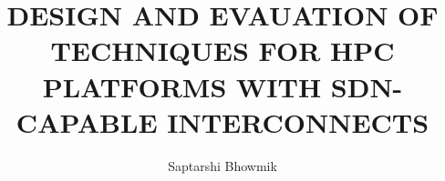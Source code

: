 \documentclass[11pt,expanded,copyright]{fsuthesis}
\title{DESIGN AND EVAUATION OF TECHNIQUES FOR HPC PLATFORMS WITH SDN-CAPABLE INTERCONNECTS}
\author{Saptarshi Bhowmik}  %
\begin{document}
\frontmatter          %
\maketitle            %
\makecommitteepage    %

\begin{comment}
\begin{dedication}
\centering
To my parents, who always suspected I'd end up here
\end{dedication}
\end{comment}


\begin{comment}
\begin{acknowledgments}
Many thanks are due to many people. My major professor didn't
know what she was getting herself into when she took me on as
a student, and I will always be grateful for her support and
guidance. The other members of my committee deserve hazard pay,
and this paper would not be the same without their diligence:
many thanks.
\end{acknowledgments}
\end{comment}

\tableofcontents
\listoftables
\listoffigures

\end{document}
